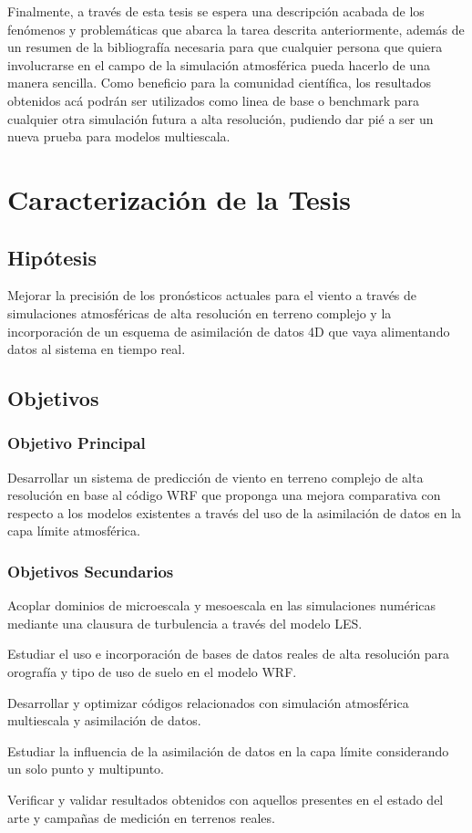 Finalmente, a través de esta tesis se espera una descripción acabada de los fenómenos y problemáticas que abarca la tarea descrita anteriormente, además de un resumen de la bibliografía necesaria para que cualquier persona que quiera involucrarse en el campo de la simulación atmosférica pueda hacerlo de una manera sencilla. Como beneficio para la comunidad científica, los resultados obtenidos acá podrán ser utilizados como linea de base o benchmark para cualquier otra simulación futura a alta resolución, pudiendo dar pié a ser un nueva prueba para modelos multiescala.

\section{Caracterización de la Tesis}
\subsection{Hipótesis}

Mejorar la precisión de los pronósticos actuales para el viento a través de simulaciones atmosféricas de alta resolución en terreno complejo y la incorporación de un esquema de asimilación de datos 4D que vaya alimentando datos al sistema en tiempo real.

\subsection{Objetivos}
\subsubsection{Objetivo Principal}
\begin{itemize*}
	\item Desarrollar un sistema de predicción de viento en terreno complejo de alta resolución en base al código WRF que proponga una mejora comparativa con respecto a los modelos existentes a través del uso de la asimilación de datos en la capa límite atmosférica.
\end{itemize*}
\subsubsection{Objetivos Secundarios}
\begin{itemize*}
	\item Acoplar dominios de microescala y mesoescala en las simulaciones numéricas mediante una clausura de turbulencia a través del modelo LES.
	\item Estudiar el uso e incorporación de bases de datos reales de alta resolución para orografía y tipo de uso de suelo en el modelo WRF.
	\item Desarrollar y optimizar códigos relacionados con simulación atmosférica multiescala y asimilación de datos.
	\item Estudiar la influencia de la asimilación de datos en la capa límite considerando un solo punto y multipunto.
	\item Verificar y validar resultados obtenidos con aquellos presentes en el estado del arte y campañas de medición en terrenos reales.
\end{itemize*}

